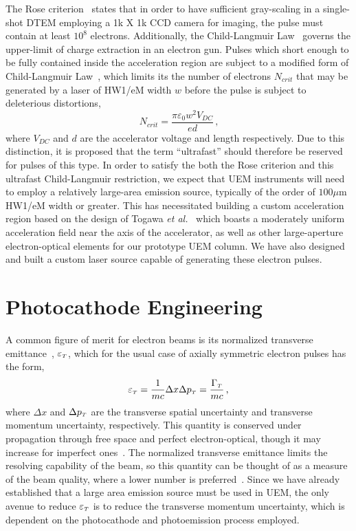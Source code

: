 The Rose criterion~\cite{rose_television_1948} states that in order to have sufficient gray-scaling in a single-shot DTEM employing a 1k X 1k CCD camera for imaging, the pulse must contain at least $10^8$ electrons.
Additionally, the Child-Langmuir Law~\cite{child_discharge_1911,langmuir_effect_1923} governs the upper-limit of charge extraction in an electron gun. 
Pulses which short enough to be fully contained inside the acceleration region are subject to a modified form of Child-Langmuir Law~\cite{valfells_effects_2002}, which limits its the number of electrons $N_{crit}$ that may be generated by a laser of HW1/eM width $w$ before the pulse is subject to deleterious distortions,
\begin{equation}
  N_{crit} = \frac{\pi \varepsilon_0 w^2 V_{DC}}{e d} \,\text{,}
\end{equation}
where $V_{DC}$ and $d$ are the accelerator voltage and length respectively.
Due to this distinction, it is proposed that the term ``ultrafast'' should therefore be reserved for pulses of this type.
In order to satisfy the both the Rose criterion and this ultrafast Child-Langmuir restriction, we expect that UEM instruments will need to employ a relatively large-area emission source, typically of the order of $100\mu\text{m}$ HW1/eM width or greater.
This has necessitated building a custom acceleration region based on the design of Togawa \textit{et al.}~\cite{togawa_ceb6_2007} which boasts a moderately uniform acceleration field near the axis of the accelerator, as well as other large-aperture electron-optical elements for our prototype UEM column.
We have also designed and built a custom laser source capable of generating these electron pulses.

\section{Photocathode Engineering}

A common figure of merit for electron beams is its normalized transverse emittance~\cite{jensen_emittance_2010}, $\varepsilon_{{\scriptscriptstyle T}}$, which for the usual case of axially symmetric electron pulses has the form,
\begin{equation}
  \varepsilon_{{\scriptscriptstyle T}} = \frac{1}{m c} \Delta x \Delta p_{{\scriptscriptstyle T}} = \frac{\Gamma_{{\scriptscriptstyle T}}}{m c} \,\text{,}
\end{equation}
where $\Delta x$ and $\Delta p_{{\scriptscriptstyle T}}$ are the transverse spatial uncertainty and transverse momentum uncertainty, respectively.
This quantity is conserved under propagation through free space and perfect electron-optical, though it may increase for imperfect ones~\cite{oshea_reversible_1998}.
The normalized transverse emittance limits the resolving capability of the beam, so this quantity can be thought of as a measure of the beam quality, where a lower number is preferred~\cite{berger_dc_2009}.
Since we have already established that a large area emission source must be used in UEM, the only avenue to reduce $\varepsilon_{{\scriptscriptstyle T}}$ is to reduce the transverse momentum uncertainty, which is dependent on the photocathode and photoemission process employed.

